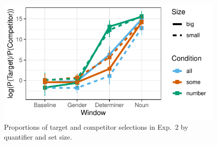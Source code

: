 \documentclass[10pt,letterpaper]{article}
\begin{document}

\begin{figure}[H]
\centering
\includegraphics[width=\columnwidth]{../../analysis/SunBreheny/1_incremental/main/graphs/results-idt}
\caption{Proportions of target and competitor selections in Exp.~2 by quantifier and set size.} 
\label{fig:results-idt}
\end{figure}
\end{document}
